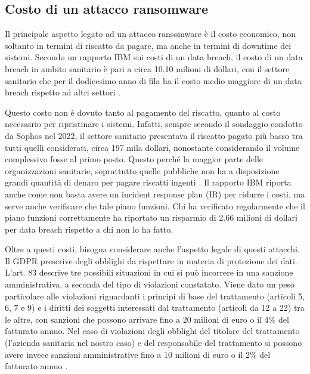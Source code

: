 \documentclass[12pt]{article}
\begin{document}
\subsection{Costo di un attacco ransomware}

Il principale aspetto legato ad un attacco ransomware è il costo economico, non soltanto in termini di riscatto da pagare, ma anche in termini di downtime dei sistemi. Secondo un rapporto IBM sui costi di un data breach, il costo di un data breach in ambito sanitario è pari a circa 10.10 milioni di dollari, con il settore sanitario che per il dodicesimo anno di fila ha il costo medio maggiore di un data breach rispetto ad altri settori \cite{noauthor_cost_2022}.

Questo costo non è dovuto tanto al pagamento del riscatto, quanto al costo necessario per ripristinare i sistemi. Infatti, sempre secondo il sondaggio condotto da Sophos nel 2022, il settore sanitario presentava il riscatto pagato più basso tra tutti quelli considerati, circa 197 mila dollari, nonostante considerando il volume complessivo fosse al primo posto. Questo perché la maggior parte delle organizzazioni sanitarie, soprattutto quelle pubbliche non ha a disposizione grandi quantità di denaro per pagare riscatti ingenti \cite{noauthor_sophos_2022}.   
Il rapporto IBM riporta anche come non basta avere un incident response plan (IR) per ridurre i costi, ma serve anche verificare che tale piano funzioni. Chi ha verificato regolarmente che il piano funzioni correttamente ha riportato un risparmio di 2.66 milioni di dollari per data breach rispetto a chi non lo ha fatto.

Oltre a questi costi, bisogna considerare anche l'aspetto legale di questi attacchi. Il GDPR prescrive degli obblighi da rispettare in materia di protezione dei dati. L'art. 83 descrive tre possibili situazioni in cui si può incorrere in una sanzione amministrativa, a seconda del tipo di violazioni constatato. Viene dato un peso particolare alle violazioni riguardanti i principi di base del trattamento (articoli 5, 6, 7 e 9) e i diritti dei soggetti interessati dal trattamento (articoli da 12 a 22) tra le altre, con sanzioni che possono arrivare fino a 20 milioni di euro o il 4\% del fatturato annuo. Nel caso di violazioni degli obblighi del titolare del trattamento (l'azienda sanitaria nel nostro caso) e del responsabile del trattamento si possono avere invece sanzioni amministrative fino a 10 milioni di euro o il 2\% del fatturato annuo \cite{noauthor_regolamento_nodate}.
\end{document}
